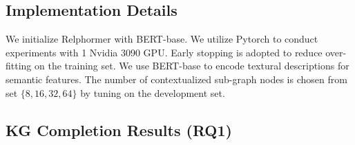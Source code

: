 \documentclass[sigconf]{acmart}
\begin{document}
\begin{table}[htbp!]
        \centering
    

\end{table} 

\subsection{Implementation Details}
\label{appendix:implementation_details}

We initialize Relphormer with BERT-base.
We utilize Pytorch to conduct experiments with 1 Nvidia 3090 GPU. 
Early stopping is adopted to reduce over-fitting on the training set.
We use BERT-base to encode textural descriptions for semantic  features.
The number of contextualized sub-graph nodes is chosen from set $\{8, 16, 32, 64\}$ by tuning on the development set. 
 




\subsection{KG Completion Results (RQ1)}
\end{document}
